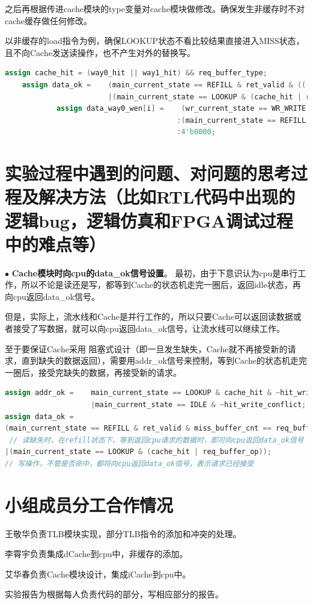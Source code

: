 \documentclass[11pt]{article}
\begin{document}
\begin{enumerate}
    之后再根据传进cache模块的type变量对cache模块做修改。确保发生非缓存时不对cache缓存做任何修改。

    以非缓存的load指令为例，确保LOOKUP状态不看比较结果直接进入MISS状态，且不向Cache发送读操作，也不产生对外的替换写。

    \begin{lstlisting}[language=verilog]
    assign cache_hit = (way0_hit || way1_hit) && req_buffer_type;
    assign data_ok =    (main_current_state == REFILL & ret_valid & (((miss_buffer_cnt == req_buffer_offset[3:2]) & req_buffer_type) | ~req_buffer_type) & ~req_buffer_op)         // read miss
                        |(main_current_state == LOOKUP & (cache_hit | req_buffer_op));             // hit or write
            assign data_way0_wen[i] =    (wr_current_state == WR_WRITE & w_buffer_way == 0 & w_buffer_bank == i)? w_buffer_wstrb
                                        :(main_current_state == REFILL & replace_way ==0 & ret_valid & miss_buffer_cnt == i & req_buffer_type) ? 4'b1111
                                        :4'b0000;
    \end{lstlisting}
    
\end{enumerate}

\section{实验过程中遇到的问题、对问题的思考过程及解决方法（比如RTL代码中出现的逻辑bug，逻辑仿真和FPGA调试过程中的难点等）}

\noindent
$\bullet$
\textbf{Cache模块时向cpu的data\_ok信号设置}。
最初，由于下意识认为cpu是串行工作，所以不论是读还是写，都等到Cache的状态机走完一圈后，返回idle状态，再向cpu返回data\_ok信号。

但是，实际上，流水线和Cache是并行工作的，所以只要Cache可以返回读数据或者接受了写数据，就可以向cpu返回data\_ok信号，让流水线可以继续工作。

至于要保证Cache采用
阻塞式设计（即一旦发生缺失，Cache就不再接受新的请求，直到缺失的数据返回），需要用addr\_ok信号来控制，等到Cache的状态机走完一圈后，接受完缺失的数据，再接受新的请求。

\begin{lstlisting}[language=verilog]
assign addr_ok =    main_current_state == LOOKUP & cache_hit & ~hit_write_conflict      // 如果发生数据缺失，Cache拉低add_ok，不接受新的请求
                    |main_current_state == IDLE & ~hit_write_conflict;
assign data_ok =    
(main_current_state == REFILL & ret_valid & miss_buffer_cnt == req_buffer_offset[3:2] & ~req_buffer_op) 
 // 读缺失时，在refill状态下，等到返回cpu请求的数据时，即可向cpu返回data_ok信号
|(main_current_state == LOOKUP & (cache_hit | req_buffer_op)); 
// 写操作，不管是否命中，都将向cpu返回data_ok信号，表示请求已经接受
\end{lstlisting}


      
\vspace{1ex}

\section{小组成员分工合作情况}
王敬华负责TLB模块实现，部分TLB指令的添加和冲突的处理。

李霄宇负责集成dCache到cpu中，非缓存的添加。

艾华春负责Cache模块设计，集成iCache到cpu中。

实验报告为根据每人负责代码的部分，写相应部分的报告。
\end{document}
